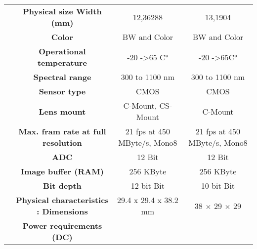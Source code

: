 \begin{table}[H]
{\begin{tabular}{ccc|cc|cc|}
\multicolumn{1}{|c|}{} &
  \multicolumn{2}{c|}{\textbf{Physical size Width  (mm)}} &
  \multicolumn{2}{c|}{12,36288} &
  \multicolumn{2}{c|}{13,1904} \\
\multicolumn{1}{|c|}{} &
  \multicolumn{2}{c|}{\cellcolor[HTML]{EFEFEF}\textbf{Color}} &
  \multicolumn{2}{c|}{\cellcolor[HTML]{EFEFEF}BW and Color} &
  \multicolumn{2}{c|}{\cellcolor[HTML]{EFEFEF}BW and Color} \\
\multicolumn{1}{|c|}{} &
  \multicolumn{2}{c|}{\textbf{Operational temperature}} &
  \multicolumn{2}{c|}{-20 -\textgreater 65 C°} &
  \multicolumn{2}{c|}{-20 -\textgreater 65C°} \\
\multicolumn{1}{|c|}{} &
  \multicolumn{2}{c|}{\cellcolor[HTML]{EFEFEF}\textbf{Spectral range}} &
  \multicolumn{2}{c|}{\cellcolor[HTML]{EFEFEF}300 to 1100 nm} &
  \multicolumn{2}{c|}{\cellcolor[HTML]{EFEFEF}300 to 1100 nm} \\
\multicolumn{1}{|c|}{} &
  \multicolumn{2}{c|}{\textbf{Sensor type}} &
  \multicolumn{2}{c|}{CMOS} &
  \multicolumn{2}{c|}{CMOS} \\
\multicolumn{1}{|c|}{} &
  \multicolumn{2}{c|}{\cellcolor[HTML]{EFEFEF}\textbf{Lens mount}} &
  \multicolumn{2}{c|}{\cellcolor[HTML]{EFEFEF}C-Mount, CS-Mount} &
  \multicolumn{2}{c|}{\cellcolor[HTML]{EFEFEF}C-Mount} \\
\multicolumn{1}{|c|}{} &
  \multicolumn{2}{c|}{\textbf{Max. fram rate at full resolution}} &
  \multicolumn{2}{c|}{21 fps at 450 MByte/s, Mono8} &
  \multicolumn{2}{c|}{21 fps at 450 MByte/s, Mono8} \\
\multicolumn{1}{|c|}{} &
  \multicolumn{2}{c|}{\cellcolor[HTML]{EFEFEF}\textbf{ADC}} &
  \multicolumn{2}{c|}{\cellcolor[HTML]{EFEFEF}12 Bit} &
  \multicolumn{2}{c|}{\cellcolor[HTML]{EFEFEF}12 Bit} \\
\multicolumn{1}{|c|}{} &
  \multicolumn{2}{c|}{\textbf{Image buffer (RAM)}} &
  \multicolumn{2}{c|}{256 KByte} &
  \multicolumn{2}{c|}{256 KByte} \\
\multicolumn{1}{|c|}{} &
  \multicolumn{2}{c|}{\cellcolor[HTML]{EFEFEF}\textbf{Bit depth}} &
  \multicolumn{2}{c|}{\cellcolor[HTML]{EFEFEF}12-bit Bit} &
  \multicolumn{2}{c|}{\cellcolor[HTML]{EFEFEF}10-bit Bit} \\
\multicolumn{1}{|c|}{} &
  \multicolumn{2}{c|}{\textbf{Physical characteristics : Dimensions}} &
  \multicolumn{2}{c|}{29.4 x 29.4 x 38.2 mm} &
  \multicolumn{2}{c|}{38 $\times$ 29 $\times$ 29} \\
\multicolumn{1}{|c|}{} &
  \multicolumn{2}{c|}{\cellcolor[HTML]{EFEFEF}\textbf{Power requirements (DC)}} &

\end{tabular}}
\end{table}
